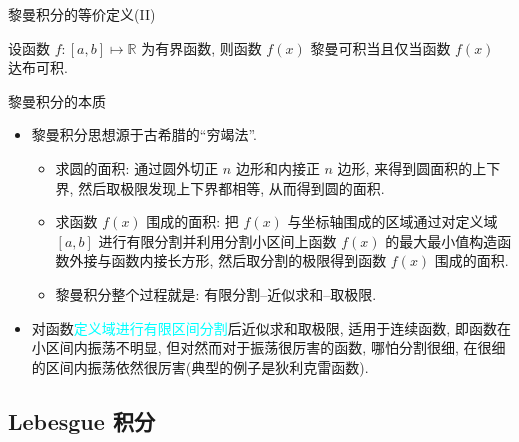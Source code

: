 \begin{frame}{黎曼积分的等价定义(II)}

	\begin{thm}
		设函数 $f:[a,b]\mapsto \mathbb{R}$ 为有界函数, 则函数 $f(x)$ 黎曼可积当且仅当函数 $f(x)$ 达布可积.
	\end{thm}

\end{frame}
\begin{frame}{黎曼积分的本质}

	\begin{itemize}[<+-|alert@+>]
		\item 黎曼积分思想源于古希腊的“穷竭法”.
		\begin{itemize}[<+-|alert@+>]
			\item 求圆的面积: 通过圆外切正 $n$ 边形和内接正 $n$ 边形, 来得到圆面积的上下界, 然后取极限发现上下界都相等, 从而得到圆的面积.
			\item 求函数 $f(x)$ 围成的面积: 把 $f(x)$ 与坐标轴围成的区域通过对定义域 $[a,b]$ 进行有限分割并利用分割小区间上函数 $f(x)$ 的最大最小值构造函数外接与函数内接长方形, 然后取分割的极限得到函数 $f(x)$ 围成的面积.
			\item 黎曼积分整个过程就是: 有限分割--近似求和--取极限.
		\end{itemize}
		\item 对函数\textcolor{cyan}{定义域进行有限区间分割}后近似求和取极限, 适用于连续函数, 即函数在小区间内振荡不明显, 但对然而对于振荡很厉害的函数, 哪怕分割很细, 在很细的区间内振荡依然很厉害(典型的例子是狄利克雷函数).
	\end{itemize}

\end{frame}
\subsection{{\rm Lebesgue} 积分}

